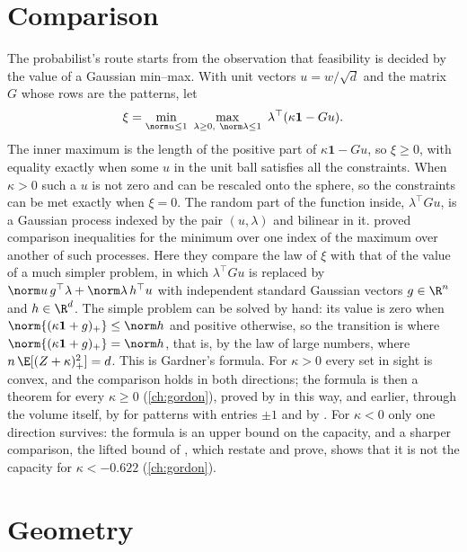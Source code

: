 \begin{refsection}
\section*{Comparison}

The probabilist's route starts from the observation that feasibility is decided by the value of a Gaussian min--max. With unit vectors $u=w/\sqrt d$ and the matrix $G$ whose rows are the patterns, let
\[
\xi=\min_{\norm u\le1}\ \max_{\lambda\ge0,\ \norm\lambda\le1}\ \lambda^\top(\kappa\mathbf1-Gu).
\]
The inner maximum is the length of the positive part of $\kappa\mathbf1-Gu$, so $\xi\ge0$, with equality exactly when some $u$ in the unit ball satisfies all the constraints. When $\kappa>0$ such a $u$ is not zero and can be rescaled onto the sphere, so the constraints can be met exactly when $\xi=0$. The random part of the function inside, $\lambda^\top Gu$, is a Gaussian process indexed by the pair $(u,\lambda)$ and bilinear in it. \textcite{Gordon1985} proved comparison inequalities for the minimum over one index of the maximum over another of such processes. Here they compare the law of $\xi$ with that of the value of a much simpler problem, in which $\lambda^\top Gu$ is replaced by $\norm u\,g^\top\lambda+\norm\lambda\,h^\top u$ with independent standard Gaussian vectors $g\in\R^n$ and $h\in\R^d$. The simple problem can be solved by hand: its value is zero when $\norm{(\kappa\mathbf1+g)_+}\le\norm h$ and positive otherwise, so the transition is where $\norm{(\kappa\mathbf1+g)_+}=\norm h$, that is, by the law of large numbers, where $n\,\E[(Z+\kappa)_+^2]=d$. This is Gardner's formula. For $\kappa>0$ every set in sight is convex, and the comparison holds in both directions; the formula is then a theorem for every $\kappa\ge0$ (\cref{ch:gordon}), proved by \textcite{Stojnic2013a} in this way, and earlier, through the volume itself, by \textcite{ShcherbinaTirozzi2003} for patterns with entries $\pm1$ and by \textcite[Chapter~8]{Talagrand2011b}. For $\kappa<0$ only one direction survives: the formula is an upper bound on the capacity, and a sharper comparison, the lifted bound of \textcite{Stojnic2013b}, which \textcite[Theorem~4.2]{MontanariZhongZhou2024} restate and prove, shows that it is not the capacity for $\kappa<-0.622$ (\cref{ch:gordon}).

\section*{Geometry}


\end{refsection}

